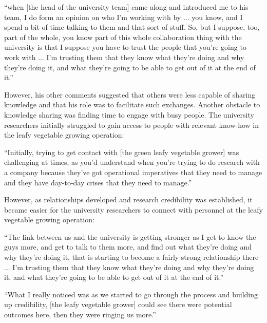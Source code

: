 \begin{displayquote}[Participant 1/1]
\small
\enquote{when [the head of the university team] came along and introduced me to his team, I do form an opinion on who I'm working with by ... you know, and I spend a bit of time talking to them and that sort of stuff. So, but I suppose, too, part of the whole, you know part of this whole collaboration thing with the university is that I suppose you have to trust the people that you’re going to work with ... I'm trusting them that they know what they're doing and why they're doing it, and what they're going to be able to get out of it at the end of it.} 
\end{displayquote}
 
 
However, his other comments suggested that others were less capable of sharing knowledge and that his role was to facilitate such exchanges. Another obstacle to knowledge sharing was finding time to engage with busy people. The university researchers initially struggled to gain access to people with relevant know-how in the leafy vegetable growing operation:   

\begin{displayquote}[Participant 16/1]
\small
\enquote{Initially, trying to get contact with [the green leafy vegetable grower] was challenging at times, as you'd understand when you're trying to do research with a company because they've got operational imperatives that they need to manage and they have day-to-day crises that they need to manage.} 
\end{displayquote}
 

However, as relationships developed and research credibility was established, it became easier for the university researchers to connect with personnel at the leafy vegetable growing operation:

\begin{displayquote}[Participant 1/1]
\small
\enquote{The link between us and the university is getting stronger as I get to know the guys more, and get to talk to them more, and find out what they're doing and why they're doing it, that is starting to become a fairly strong relationship there ... I'm trusting them that they know what they’re doing and why they’re doing it, and what they're going to be able to get out of it at the end of it.} 
\end{displayquote}
 

\begin{displayquote}[Participant 16/1]
\small
\enquote{What I really noticed was as we started to go through the process and building up credibility, [the leafy vegetable grower] could see there were potential outcomes here, then they were ringing us more.} 
\end{displayquote}
 

